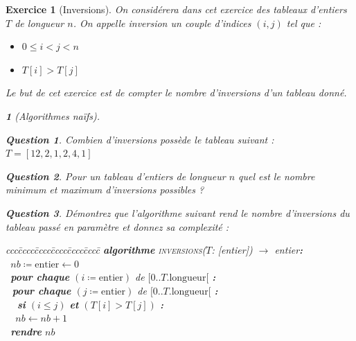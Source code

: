 \documentclass{article}
\theoremstyle{exostyle}
\newtheorem{exo}{Exercice}
\theoremstyle{partiestyle}
\newtheorem{partie}{}[exo]
\theoremstyle{questionstyle}
\newtheorem{questionpartie}{Question}[partie]
\begin{document}
\begin{exo}[Inversions]
    On considérera dans cet exercice des tableaux d'entiers $T$ de longueur $n$. On appelle \textit{inversion} un couple d'indices $(i, j)$ tel que  :
    \begin{itemize}
        \item $0 \leq i <  j < n$
        \item $T[i] >  T[j]$
    \end{itemize}
    Le but de cet exercice est de compter le nombre d'inversions d'un tableau donné. 
    \begin{partie}[Algorithmes naïfs]
        ~\vspace*{-.5cm}
        \begin{questionpartie}
            Combien d'inversions possède le tableau suivant : $T = [12, 2, 1, 2, 4, 1]$
        \end{questionpartie}
        \begin{questionpartie}
            Pour un tableau d'entiers de longueur $n$ quel est le nombre minimum et maximum d'inversions possibles ?
        \end{questionpartie}
        \begin{questionpartie}
            Démontrez que l'algorithme suivant rend le nombre d'inversions du tableau passé en paramètre et donnez sa complexité :
        \begin{tabbing}
            ccc\=cccc\=cccc\=cccc\=cccc\=cccc\=\kill
            \textbf{algorithme} \textsc{inversions}($T$: [entier]) $\rightarrow$ entier{\bf :}\\
            \>\vline$\,$ $nb \coloneqq \text{entier} \leftarrow 0$\\
            \>\vline$\,$ \textbf{pour chaque} $(i \coloneqq \text{entier})$ de $[0 .. T.\text{longueur}[$ {\bf :}\\
            \>\vline$\,$\>\vline$\,$ \textbf{pour chaque} $(j \coloneqq \text{entier})$ de $[0 .. T.\text{longueur}[$ {\bf :}\\
            \>\vline$\,$\>\vline$\,$ \>\vline$\,$ \textbf{si} $(i \leq j)$ \textbf{et} $(T[i] > T[j])$ {\bf :}\\
            \>\vline$\,$\>\vline$\,$\>\vline$\,$\>\vline$\,$ $nb \leftarrow nb + 1$\\
            \>\vline$\,$ \textbf{rendre} $nb$\\
        \end{tabbing}
        \vspace*{-.5cm}
        \end{questionpartie}

\end{partie}
\end{exo}
\end{document}
